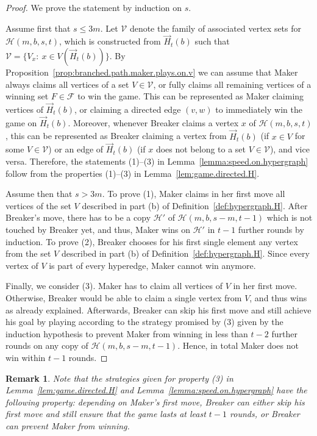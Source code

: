 \documentclass[reqno, 12pt]{amsart}
\numberwithin{equation}{section}
\numberwithin{figure}{section}
\newtheorem{remark}[theorem]{Remark}
\begin{document}
\begin{proof}
We prove the statement by induction on $s$.

Assume first that $s\leq 3m$. Let $\mathcal{V}$ denote the family of associated vertex sets for
$\mathcal{H}(m,b,s,t)$, which is constructed from $\vec{H}_t(b)$
such that $\mathcal{V} = \{V_x:~ x\in V(\vec{H}_t(b))\}$. 
By Proposition~\ref{prop:branched.path.maker.plays.on.v}
we can assume that Maker always claims all vertices of a set $V\in \mathcal{V}$, or fully claims all remaining vertices of a winning set $F \in \mathcal{F}$ to win the game.
This can be represented as Maker claiming vertices of 
$\vec{H}_t(b)$, or claiming a directed edge $(v,w)$ to immediately win the game on $\vec{H}_t(b)$.
Moreover, whenever Breaker claims a vertex $x$ of $\mathcal{H}(m,b,s,t)$, this can be represented as Breaker claiming a vertex from $\vec{H}_t(b)$ (if $x\in V$ for some $V\in \mathcal{V}$)
or an edge of $\vec{H}_t(b)$ (if $x$ does not belong to a set $V\in \mathcal{V}$), and vice versa. Therefore, the statements (1)--(3) in Lemma~\ref{lemma:speed.on.hypergraph}
follow from the properties (1)--(3) in
Lemma~\ref{lem:game.directed.H}.

\smallskip

Assume then that $s> 3m$. 
To prove (1), Maker claims in her first move all vertices of the set $V$ described in part (b) of Definition~\ref{def:hypergraph.H}. After Breaker's move, there has to be a copy $\mathcal{H}'$ of $\mathcal{H}(m,b,s-m,t-1)$ which is not touched by Breaker yet, and thus, Maker wins on $\mathcal{H}'$ in $t-1$ further rounds by induction.
%
To prove (2), Breaker chooses for his first single element any vertex from the set $V$ described in part (b) of Definition~\ref{def:hypergraph.H}. Since every vertex of $V$ is part of every hyperedge, Maker cannot win anymore.
%


Finally, we consider (3). Maker has to claim all vertices of $V$ in her first move. Otherwise, Breaker would be able to claim a single vertex from $V$, and thus wins as already explained. Afterwards, Breaker can skip his first move and still achieve his goal by playing according to the strategy promised by (3) given by the induction hypothesis to prevent Maker from winning in less than $t - 2$ further rounds on any copy of $\mathcal{H}(m,b,s-m,t-1)$. Hence, in total Maker does not win within $t-1$ rounds.
\end{proof}


\begin{remark}\label{remark:skipping.move}
Note that the strategies given for property (3) in Lemma~\ref{lem:game.directed.H} and Lemma~\ref{lemma:speed.on.hypergraph} have the following property: depending on Maker's first move, Breaker can either skip his first move and still ensure that the game lasts at least $t-1$ rounds, or Breaker can prevent Maker from winning.
\end{remark}
\end{document}

